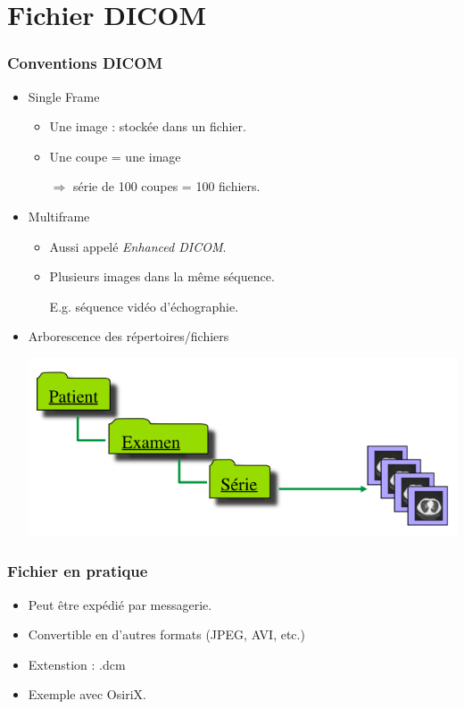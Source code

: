 \section{Fichier DICOM}

\frame
{
	\frametitle{Conventions DICOM}
	\begin{itemize}
		\item Single Frame
		\begin{itemize}
			\item Une image : stock\'ee dans un fichier.
			\item Une coupe = une image
		
			$\Rightarrow$ s\'erie de 100 coupes = 100 fichiers.
		\end{itemize}
		\item Multiframe
		\begin{itemize}
			\item Aussi appel\'e \emph{Enhanced DICOM}.
			\item Plusieurs images dans la m\^eme s\'equence.
			
			E.g. s\'equence vid\'eo d'\'echographie.
		\end{itemize}
		\item Arborescence des r\'epertoires/fichiers
		\begin{center}
			\includegraphics[width=.8\linewidth]{./figures/arborescence.png}
		\end{center}

	\end{itemize}
}

\frame
{
	\frametitle{Fichier en pratique}
	
	\begin{itemize}
		\item Peut \^etre exp\'edi\'e par messagerie.
		\item Convertible en d'autres formats (JPEG, AVI, etc.)
		\item Extenstion : .dcm
		\item Exemple avec OsiriX.
	\end{itemize}
}

